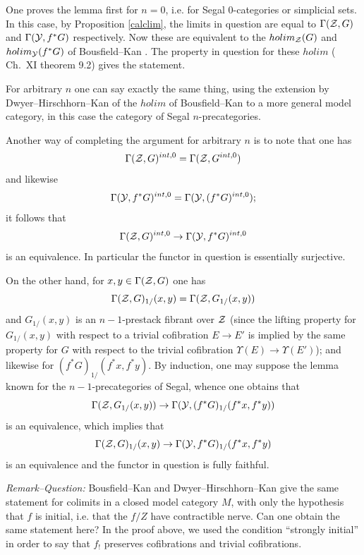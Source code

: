 One proves the lemma first for $n=0$, i.e. for Segal $0$-categories or
simplicial sets. In this case, by Proposition \ref{calclim}, the limits in
question are equal to $\Gamma ({\cal Z} , G)$ and $\Gamma ({\cal Y} , f^{\ast}G)$
respectively. Now these are equivalent to the $holim_{{\cal Z}}(G)$ and
$holim_{{\cal Y}}(f^{\ast}G)$ of Bousfield--Kan \cite{BousfieldKan}. The property in
question for these $holim$ (\cite{BousfieldKan} Ch.~XI theorem 9.2) gives the
statement.

For arbitrary $n$ one can say exactly the same thing, using the extension by
Dwyer--Hirschhorn--Kan of the $holim$ of Bousfield--Kan to a more general model
category, in this case the category of Segal $n$-precategories.

Another way of completing the argument for arbitrary $n$ is to note that one
has
$$
\Gamma ({\cal Z} , G)^{int, 0}=
\Gamma ({\cal Z} , G^{int, 0})
$$
and likewise
$$
\Gamma ({\cal Y} , f^{\ast}G)^{int, 0}=
\Gamma ({\cal Y} , (f^{\ast}G)^{int, 0});
$$
it follows that
$$
\Gamma ({\cal Z} , G)^{int, 0}\rightarrow
\Gamma ({\cal Y} , f^{\ast}G)^{int, 0}
$$
is an equivalence. In particular the functor in question is essentially
surjective.

On the other hand, for $x,y\in \Gamma ({\cal Z} , G)$ one has
$$
\Gamma ({\cal Z} , G)_{1/}(x,y) =
\Gamma ({\cal Z} , G_{1/}(x,y))
$$
and $G_{1/}(x,y)$ is an $n-1$-prestack fibrant over ${\cal Z}$ (since the lifting
property for $G_{1/}(x,y)$ with respect to a trivial cofibration
$E\rightarrow E'$ is implied by the same property for $G$ with respect to the
trivial cofibration $\Upsilon (E)\rightarrow \Upsilon (E')$); and likewise for
$(f^{\ast}G )_{1/}(f^{\ast}x, f^{\ast}y)$. By induction, one may suppose the
lemma known for the $n-1$-precategories of Segal, whence one obtains that
$$
\Gamma ({\cal Z} , G_{1/}(x,y))\rightarrow \Gamma ({\cal Y} , (f^{\ast}G)_{1/}(f^{\ast}x,
f^{\ast}y))
$$
is an equivalence, which implies that
$$
\Gamma ({\cal Z} , G)_{1/}(x,y)\rightarrow
\Gamma ({\cal Y} , f^{\ast}G)_{1/}(f^{\ast}x, f^{\ast}y)
$$
is an equivalence and the functor in question is fully faithful.
\eop

{\em Remark--Question:}
Bousfield--Kan and Dwyer--Hirschhorn--Kan give the same statement for colimits
in a closed model category $M$, with only the hypothesis that $f$ is initial,
i.e. that the $f/Z$ have contractible nerve. Can one obtain the same statement
here? In the proof above, we used the condition ``strongly initial'' in order to
say that $f_!$ preserves cofibrations and trivial cofibrations.

